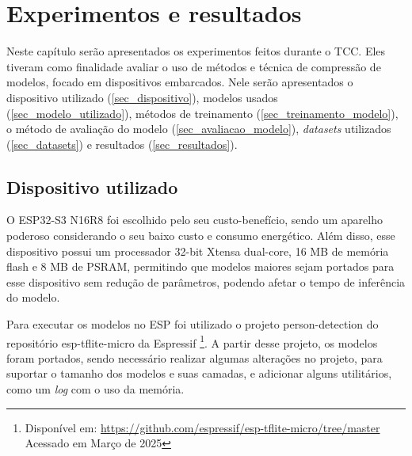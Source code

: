 \chapter{Experimentos e resultados}\label{experimentos}

Neste capítulo serão apresentados os experimentos feitos durante o TCC. Eles tiveram como
finalidade avaliar o uso de métodos e técnica de compressão de modelos, focado em dispositivos
embarcados. Nele serão apresentados o dispositivo utilizado (\autoref{sec_dispositivo}),
modelos usados (\autoref{sec_modelo_utilizado}), métodos de treinamento (\autoref{sec_treinamento_modelo}),
o método de avaliação do modelo (\autoref{sec_avaliacao_modelo}), \textit{datasets} utilizados
(\autoref{sec_datasets}) e resultados (\autoref{sec_resultados}).

\section{Dispositivo utilizado}\label{sec_dispositivo}
%
%
%
O ESP32-S3 N16R8 foi escolhido pelo seu custo-benefício, sendo um aparelho poderoso considerando o seu baixo
custo e consumo energético. Além disso, esse dispositivo possui um processador 32-bit Xtensa dual-core,
16 MB de memória flash e 8 MB de PSRAM, permitindo que modelos maiores sejam portados para esse dispositivo sem redução
de parâmetros, podendo afetar o tempo de inferência do modelo.

Para executar os modelos no ESP foi utilizado o projeto person-detection do repositório esp-tflite-micro da Espressif
\footnote{Disponível em: \url{https://github.com/espressif/esp-tflite-micro/tree/master} Acessado em Março de 2025}.
A partir desse projeto, os modelos foram portados, sendo necessário realizar algumas alterações no projeto,
para suportar o tamanho dos modelos e suas camadas, e adicionar alguns utilitários, como um \textit{log} com
o uso da memória.

